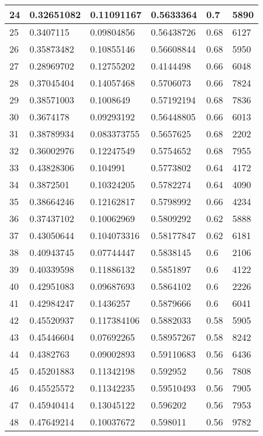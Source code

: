 \begin{longtable}{|l|l|l|l|l|l|}
24 & 0.32651082 & 0.11091167 & 0.5633364 & 0.7 & 5890 \\ \hline 
25 & 0.3407115 & 0.09804856 & 0.56438726 & 0.68 & 6127 \\ \hline 
26 & 0.35873482 & 0.10855146 & 0.56608844 & 0.68 & 5950 \\ \hline 
27 & 0.28969702 & 0.12755202 & 0.4144498 & 0.66 & 6048 \\ \hline 
28 & 0.37045404 & 0.14057468 & 0.5706073 & 0.66 & 7824 \\ \hline 
29 & 0.38571003 & 0.1008649 & 0.57192194 & 0.68 & 7836 \\ \hline 
30 & 0.3674178 & 0.09293192 & 0.56448805 & 0.66 & 6013 \\ \hline 
31 & 0.38789934 & 0.083373755 & 0.5657625 & 0.68 & 2202 \\ \hline 
32 & 0.36002976 & 0.12247549 & 0.5754652 & 0.68 & 7955 \\ \hline 
33 & 0.43828306 & 0.104991 & 0.5773802 & 0.64 & 4172 \\ \hline 
34 & 0.3872501 & 0.10324205 & 0.5782274 & 0.64 & 4090 \\ \hline 
35 & 0.38664246 & 0.12162817 & 0.5798992 & 0.66 & 4234 \\ \hline 
36 & 0.37437102 & 0.10062969 & 0.5809292 & 0.62 & 5888 \\ \hline 
37 & 0.43050644 & 0.104073316 & 0.58177847 & 0.62 & 6181 \\ \hline 
38 & 0.40943745 & 0.07744447 & 0.5838145 & 0.6 & 2106 \\ \hline 
39 & 0.40339598 & 0.11886132 & 0.5851897 & 0.6 & 4122 \\ \hline 
40 & 0.42951083 & 0.09687693 & 0.5864102 & 0.6 & 2226 \\ \hline 
41 & 0.42984247 & 0.1436257 & 0.5879666 & 0.6 & 6041 \\ \hline 
42 & 0.45520937 & 0.117384106 & 0.5882033 & 0.58 & 5905 \\ \hline 
43 & 0.45446604 & 0.07692265 & 0.58957267 & 0.58 & 8242 \\ \hline 
44 & 0.4382763 & 0.09002893 & 0.59110683 & 0.56 & 6436 \\ \hline 
45 & 0.45201883 & 0.11342198 & 0.592952 & 0.56 & 7808 \\ \hline 
46 & 0.45525572 & 0.11342235 & 0.59510493 & 0.56 & 7905 \\ \hline 
47 & 0.45940414 & 0.13045122 & 0.596202 & 0.56 & 7953 \\ \hline 
48 & 0.47649214 & 0.10037672 & 0.598011 & 0.56 & 9782 \\ \hline 

\end{longtable}

